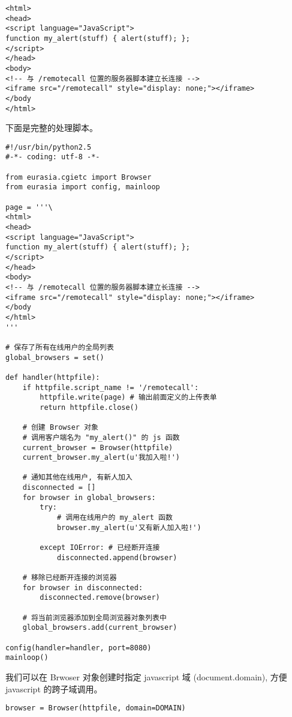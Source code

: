 \documentclass{manual}
\begin{document}
\begin{verbatim}
<html>
<head>
<script language="JavaScript">
function my_alert(stuff) { alert(stuff); };
</script>
</head>
<body>
<!-- 与 /remotecall 位置的服务器脚本建立长连接 -->
<iframe src="/remotecall" style="display: none;"></iframe>
</body
</html>
\end{verbatim}

下面是完整的处理脚本。

\begin{verbatim}
#!/usr/bin/python2.5
#-*- coding: utf-8 -*-

from eurasia.cgietc import Browser
from eurasia import config, mainloop

page = '''\
<html>
<head>
<script language="JavaScript">
function my_alert(stuff) { alert(stuff); };
</script>
</head>
<body>
<!-- 与 /remotecall 位置的服务器脚本建立长连接 -->
<iframe src="/remotecall" style="display: none;"></iframe>
</body
</html>
'''

# 保存了所有在线用户的全局列表
global_browsers = set()

def handler(httpfile):
	if httpfile.script_name != '/remotecall':
		httpfile.write(page) # 输出前面定义的上传表单
		return httpfile.close()

	# 创建 Browser 对象
	# 调用客户端名为 "my_alert()" 的 js 函数
	current_browser = Browser(httpfile)
	current_browser.my_alert(u'我加入啦!')

	# 通知其他在线用户, 有新人加入
	disconnected = []
	for browser in global_browsers:
		try:
			# 调用在线用户的 my_alert 函数
			browser.my_alert(u'又有新人加入啦!')

		except IOError: # 已经断开连接
			disconnected.append(browser)

	# 移除已经断开连接的浏览器
	for browser in disconnected:
		disconnected.remove(browser)

	# 将当前浏览器添加到全局浏览器对象列表中
	global_browsers.add(current_browser)

config(handler=handler, port=8080)
mainloop()
\end{verbatim}

我们可以在 Brwoser 对象创建时指定 javascript 域 (document.domain),
方便 javascript 的跨子域调用。

\begin{verbatim}
browser = Browser(httpfile, domain=DOMAIN)
\end{verbatim}

\end{document}
